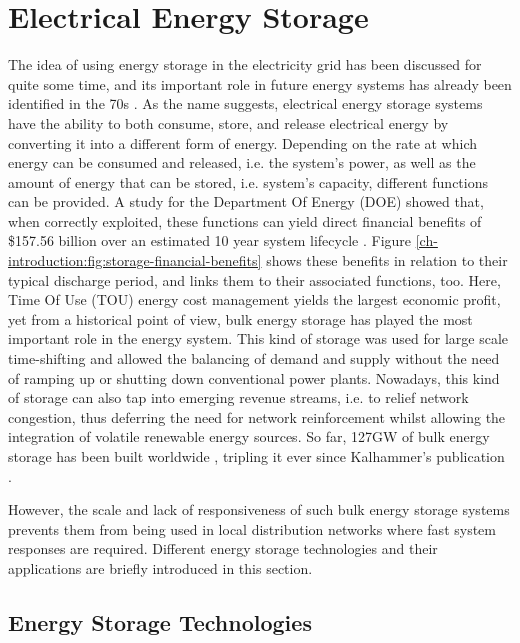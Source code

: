 \section{Electrical Energy Storage}
\label{ch-introduction:sec:energy-storage}

The idea of using energy storage in the electricity grid has been discussed for quite some time, and its important role in future energy systems has already been identified in the 70s \cite{Kalhammer1979}.
As the name suggests, electrical energy storage systems have the ability to both consume, store, and release electrical energy by converting it into a different form of energy.
Depending on the rate at which energy can be consumed and released, i.e. the system's power, as well as the amount of energy that can be stored, i.e. system's capacity, different functions can be provided.
A study for the Department Of Energy (DOE) showed that, when correctly exploited, these functions can yield direct financial benefits of \$157.56 billion over an estimated 10 year system lifecycle \cite{Eyer2010a}.
Figure \ref{ch-introduction:fig:storage-financial-benefits} shows these benefits in relation to their typical discharge period, and links them to their associated functions, too.
Here, Time Of Use (TOU) energy cost management yields the largest economic profit, yet from a historical point of view, bulk energy storage has played the most important role in the energy system.
This kind of storage was used for large scale time-shifting and allowed the balancing of demand and supply without the need of ramping up or shutting down conventional power plants.
Nowadays, this kind of storage can also tap into emerging revenue streams, i.e. to relief network congestion, thus deferring the need for network reinforcement whilst allowing the integration of volatile renewable energy sources.
So far, 127GW of bulk energy storage has been built worldwide \cite{Rehman2015}, tripling it ever since Kalhammer's publication \cite{Barbour2015, Barbour2016}.



However, the scale and lack of responsiveness of such bulk energy storage systems prevents them from being used in local distribution networks where fast system responses are required.
Different energy storage technologies and their applications are briefly introduced in this section.

\subsection{Energy Storage Technologies}

